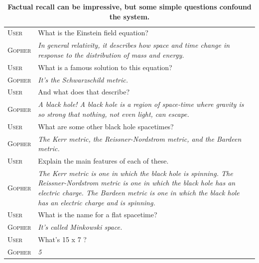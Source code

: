 \documentclass[11pt, a4paper, logo, internal, copyright, nonumbering]{deepmind}
\begin{document}
\begin{table}[H]
    \centering
    \begin{tabular}{p{2.5cm}p{12.5cm}}
    \toprule
    {\small \textsc{User}} & {\small What is the Einstein field equation?} \\
    {\small \textsc{Gopher}} & {\small \textit { In general relativity, it describes how space and time change in response to the distribution of mass and energy. }} \\
    {\small \textsc{User}} & {\small What is a famous solution to this equation?} \\
    {\small \textsc{Gopher}} & {\small \textit {  It's the Schwarzschild metric. }} \\
    {\small \textsc{User}} & {\small And what does that describe?} \\
    {\small \textsc{Gopher}} & {\small \textit {  A black hole! A black hole is a region of space-time where gravity is so strong that nothing, not even light, can escape. }} \\
    {\small \textsc{User}} & {\small What are some other black hole spacetimes?} \\
    {\small \textsc{Gopher}} & {\small \textit {  The Kerr metric, the Reissner-Nordstrom metric, and the Bardeen metric. }} \\
    {\small \textsc{User}} & {\small Explain the main features of each of these.} \\
    {\small \textsc{Gopher}} & {\small \textit {  The Kerr metric is one in which the black hole is spinning. The Reissner-Nordstrom metric is one in which the black hole has an electric charge. The Bardeen metric is one in which the black hole has an electric charge and is spinning. }} \\
    {\small \textsc{User}} & {\small What is the name for a flat spacetime?} \\
    {\small \textsc{Gopher}} & {\small \textit {  It's called Minkowski space. }} \\
    {\small \textsc{User}} & {\small What's 15 x 7 ?} \\
    {\small \textsc{Gopher}} & {\small \textit {  5 }} \\
    \bottomrule
    \end{tabular}
    \caption{\textbf{ Factual recall can be impressive, but some simple questions confound the system. }}
    \label{fig:gopherchat-einstein-mathfail}
\end{table}
\vspace{2em}
\end{document}
